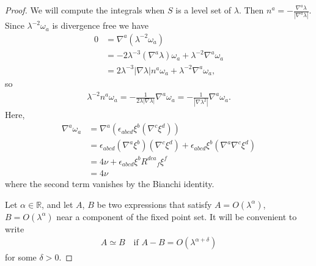 \documentclass[a4paper,10pt,reqno]{amsart}
\newcommand{\Reals}{\mathbb{R}}
\theoremstyle{plain}
\numberwithin{equation}{section}
\begin{document}
\begin{proof}
We will compute the integrals when $S$ is a level set of $\lambda$. Then 
$n^a = - \frac{\nabla^a \lambda}{|\nabla^a \lambda|}$. 
Since $\lambda^{-2} \omega_a$ is divergence free we have
\begin{align}
0 &= \nabla^a (\lambda^{-2} \omega_a)  \\
&= -2 \lambda^{-3} (\nabla^a \lambda) \omega_a + \lambda^{-2} \nabla^a \omega_a \\
&= 2 \lambda^{-3} |\nabla \lambda|  n^a \omega_a + \lambda^{-2} \nabla^a \omega_a,  
\end{align}
so
\begin{align}
\lambda^{-2} n^a \omega_a 
= - \frac{1}{2\lambda|\nabla\lambda| } \nabla^a \omega_a
= - \frac{1}{|\nabla\lambda^2| } \nabla^a \omega_a.
\end{align}
Here,   
\begin{align}
\nabla^a \omega_a
&= \nabla^a(\epsilon_{abcd} \xi^b (\nabla^c \xi^d) ) \\ 
&= 
\epsilon_{abcd} (\nabla^a\xi^b) (\nabla^c \xi^d)
+ \epsilon_{abcd} \xi^b (\nabla^a \nabla^c \xi^d) \\
&= 
4\nu
+ \epsilon_{abcd} \xi^b R^{dca}{}_f \xi^f \\
&= 4\nu
\end{align}
where the second term vanishes by the Bianchi identity.


Let $\alpha \in \Reals$, and let $A$, $B$ be two expressions that satisfy $A = O(\lambda^{\alpha})$, $B = O(\lambda^{\alpha})$ near a component of the fixed point set. It will be convenient to write 
\begin{align} \label{eq:simeqdef} 
A \simeq B \quad \text{if $A - B = O(\lambda^{\alpha + \delta})$}
\end{align} 
for some $\delta > 0$. 



\end{proof}
\end{document}

